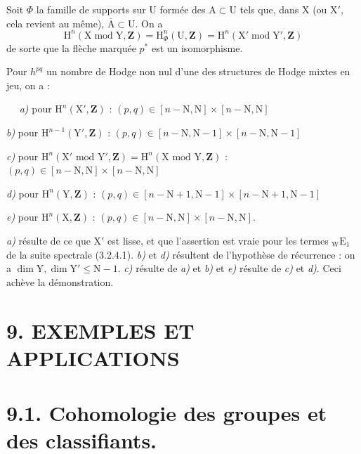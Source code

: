 \documentclass[11pt,leqno]{article}
\newcommand{\Page}[1]{\ifvmode\noindent\else\unskip\ \fi{\footnotesize\textcolor{gray}{[p.\,#1]}}\ \ignorespaces}
\begin{document}
Soit \(\Phi\) la famille de supports sur \(\mathrm{U}\) formée des \(\mathrm{A}\subset\mathrm{U}\) tels que, dans \(\mathrm{X}\) (ou \(\mathrm{X}'\), cela revient au même), \(\overline{\mathrm{A}}\subset\mathrm{U}\). On a
\[
\mathrm{H}^n(\mathrm{X}\operatorname{mod}\mathrm{Y},\mathbf{Z})
=\mathrm{H}^n_\Phi(\mathrm{U},\mathbf{Z})
=\mathrm{H}^n(\mathrm{X}'\operatorname{mod}\mathrm{Y}',\mathbf{Z})
\]
de sorte que la flèche marquée \(p^*\) est un isomorphisme.

Pour \(h^{pq}\) un nombre de Hodge non nul d’une des structures de Hodge mixtes en jeu, on a :

\Page{45}
\noindent\textit{a)} pour \(\mathrm{H}^{n}(\mathrm{X}',\mathbf{Z})\) : \((p,q)\in[n-\mathrm{N},\mathrm{N}]\times[n-\mathrm{N},\mathrm{N}]\)

\noindent\textit{b)} pour \(\mathrm{H}^{n-1}(\mathrm{Y}',\mathbf{Z})\) : \((p,q)\in[n-\mathrm{N},\mathrm{N}-1]\times[n-\mathrm{N},\mathrm{N}-1]\)

\noindent\textit{c)} pour \(\mathrm{H}^{n}(\mathrm{X}'\text{ mod }\mathrm{Y}',\mathbf{Z})=\mathrm{H}^{n}(\mathrm{X}\text{ mod }\mathrm{Y},\mathbf{Z})\) : \((p,q)\in[n-\mathrm{N},\mathrm{N}]\times[n-\mathrm{N},\mathrm{N}]\)

\noindent\textit{d)} pour \(\mathrm{H}^{n}(\mathrm{Y},\mathbf{Z})\) : \((p,q)\in[n-\mathrm{N}+1,\mathrm{N}-1]\times[n-\mathrm{N}+1,\mathrm{N}-1]\)

\noindent\textit{e)} pour \(\mathrm{H}^{n}(\mathrm{X},\mathbf{Z})\) : \((p,q)\in[n-\mathrm{N},\mathrm{N}]\times[n-\mathrm{N},\mathrm{N}]\).

\textit{a)} résulte de ce que \(\mathrm{X}'\) est lisse, et que l’assertion est vraie pour les termes \({}_{\mathrm{W}}\mathrm{E}_{1}\) de la suite spectrale (3.2.4.1). \textit{b)} et \textit{d)} résultent de l’hypothèse de récurrence : on a \(\dim\mathrm{Y},\dim\mathrm{Y}'\leq\mathrm{N}-1\). \textit{c)} résulte de \textit{a)} et \textit{b)} et \textit{e)} résulte de \textit{c)} et \textit{d)}. Ceci achève la démonstration.

\section*{9. EXEMPLES ET APPLICATIONS}

\section*{9.1. Cohomologie des groupes et des classifiants.}
\end{document}
